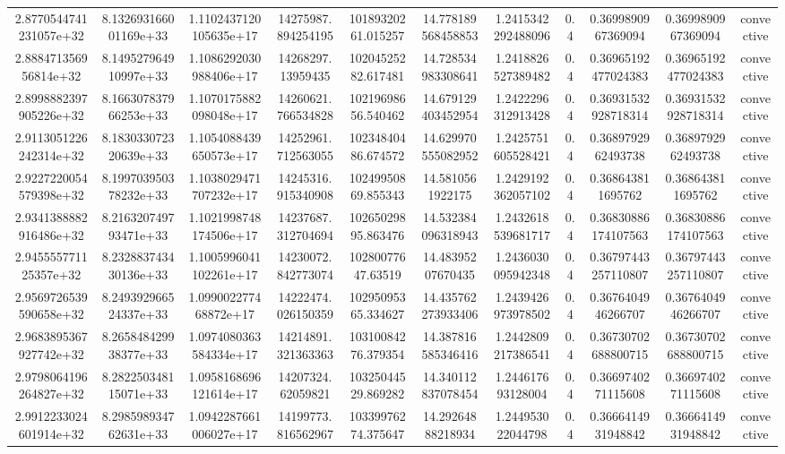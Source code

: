 \begin{table}
\begin{tabular}{ccccccccccc}
2.8770544741231057e+32 & 8.132693166001169e+33 & 1.1102437120105635e+17 & 14275987.894254195 & 10189320261.015257 & 14.778189568458853 & 1.2415342292488096 & 0.4 & 0.3699890967369094 & 0.3699890967369094 & convective \\
2.888471356956814e+32 & 8.149527964910997e+33 & 1.1086292030988406e+17 & 14268297.13959435 & 10204525282.617481 & 14.728534983308641 & 1.2418826527389482 & 0.4 & 0.36965192477024383 & 0.36965192477024383 & convective \\
2.8998882397905226e+32 & 8.166307837966253e+33 & 1.1070175882098048e+17 & 14260621.766534828 & 10219698656.540462 & 14.679129403452954 & 1.2422296312913428 & 0.4 & 0.36931532928718314 & 0.36931532928718314 & convective \\
2.9113051226242314e+32 & 8.183033072320639e+33 & 1.1054088439650573e+17 & 14252961.712563055 & 10234840486.674572 & 14.629970555082952 & 1.2425751605528421 & 0.4 & 0.3689792962493738 & 0.3689792962493738 & convective \\
2.9227220054579398e+32 & 8.199703950378232e+33 & 1.1038029471707232e+17 & 14245316.915340908 & 10249950869.855343 & 14.5810561922175 & 1.2429192362057102 & 0.4 & 0.368643811695762 & 0.368643811695762 & convective \\
2.9341388882916486e+32 & 8.216320749793471e+33 & 1.1021998748174506e+17 & 14237687.312704694 & 10265029895.863476 & 14.532384096318943 & 1.2432618539681717 & 0.4 & 0.36830886174107563 & 0.36830886174107563 & convective \\
2.945555771125357e+32 & 8.232883743430136e+33 & 1.1005996041102261e+17 & 14230072.842773074 & 10280077647.63519 & 14.48395207670435 & 1.2436030095942348 & 0.4 & 0.36797443257110807 & 0.36797443257110807 & convective \\
2.9569726539590658e+32 & 8.249392966524337e+33 & 1.099002277468872e+17 & 14222474.026150359 & 10295095365.334627 & 14.435762273933406 & 1.2439426973978502 & 0.4 & 0.3676404946266707 & 0.3676404946266707 & convective \\
2.9683895367927742e+32 & 8.265848429938377e+33 & 1.0974080363584334e+17 & 14214891.321363363 & 10310084276.379354 & 14.387816585346416 & 1.2442809217386541 & 0.4 & 0.36730702688800715 & 0.36730702688800715 & convective \\
2.9798064196264827e+32 & 8.282250348115071e+33 & 1.0958168696121614e+17 & 14207324.62059821 & 10325044529.869282 & 14.340112837078454 & 1.244617693128004 & 0.4 & 0.3669740271115608 & 0.3669740271115608 & convective \\
2.9912233024601914e+32 & 8.298598934762631e+33 & 1.0942287661006027e+17 & 14199773.816562967 & 10339976274.375647 & 14.29264888218934 & 1.244953022044798 & 0.4 & 0.3666414931948842 & 0.3666414931948842 & convective \\

\end{tabular}
\end{table}
